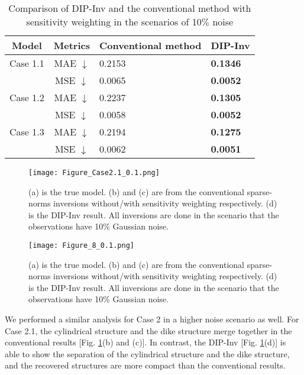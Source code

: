 \documentclass{article}
\begin{document}
\begin{table}[b!]
\centering
\caption{Comparison of DIP-Inv and the conventional method with sensitivity weighting in the scenarios of 10$\%$ noise}
\begin{tabular}{|c|c|l|l|}
\hline
Model & Metrics & Conventional method & DIP-Inv\\
\hline
Case 1.1 & MAE $\downarrow$ & 0.2153 & \textbf{0.1346}\\
 & MSE $\downarrow$ & 0.0065 & \textbf{0.0052}\\
\hline
Case 1.2 & MAE $\downarrow$ & 0.2237 & \textbf{0.1305}\\
 & MSE $\downarrow$ & 0.0058 & \textbf{0.0052}\\
\hline
Case 1.3 & MAE $\downarrow$ & 0.2194 & \textbf{0.1275}\\
 & MSE $\downarrow$ & 0.0062 & \textbf{0.0051}\\ 
\hline
\end{tabular}
\label{table:1}
\end{table}

\begin{figure}[h!]
\centering
\texttt{[image: Figure\_Case2.1\_0.1.png]}
\caption{(a) is the true model. (b) and (c) are from the conventional sparse-norms inversions without/with sensitivity weighting respectively. (d) is the DIP-Inv result. All inversions are done in the scenario that the observations have 10$\%$ Gaussian noise.}
\label{fig_2}
\end{figure} 


\begin{figure}[h!]
\centering
\texttt{[image: Figure\_8\_0.1.png]}
\caption{(a) is the true model. (b) and (c) are from the conventional sparse-norms inversions without/with sensitivity weighting respectively. (d) is the DIP-Inv result. All inversions are done in the scenario that the observations have 10$\%$ Gaussian noise.}
\label{fig_3}
\end{figure}

We performed a similar analysis for Case 2 in a higher noise scenario as well. For Case 2.1, the cylindrical structure and the dike structure merge together in the conventional results [Fig. \ref{fig_2}(b) and (c)]. In contrast, the DIP-Inv [Fig. \ref{fig_2}(d)] is able to show the separation of the cylindrical structure and the dike structure, and the recovered structures are more compact than the conventional results. 
\end{document}
